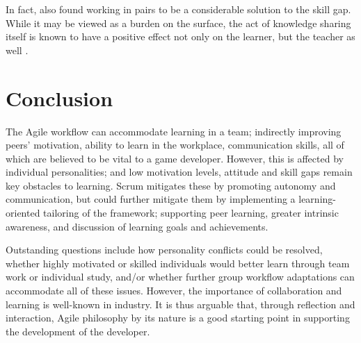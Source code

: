 \documentclass{scrartcl}
\begin{document}
In fact, \cite{group2005} also found working in pairs to be a considerable solution to the skill gap. While it may be viewed as a burden on the surface, the act of knowledge sharing itself is known to have a positive effect not only on the learner, but the teacher as well \cite{activepassive, motivation}.

\section{Conclusion}
The Agile workflow can accommodate learning in a team; indirectly improving peers' motivation, ability to learn in the workplace, communication skills, all of which are believed to be vital to a game developer. However, this is affected by individual personalities; and low motivation levels, attitude and skill gaps remain key obstacles to learning. Scrum mitigates these by promoting autonomy and communication, but could further mitigate them by implementing a learning-oriented tailoring of the framework; supporting peer learning, greater intrinsic awareness, and discussion of learning goals and achievements.

Outstanding questions include how personality conflicts could be resolved, whether highly motivated or skilled individuals would better learn through team work or individual study, and/or whether further group workflow adaptations can accommodate all of these issues. However, the importance of collaboration and learning is well-known in industry. It is thus arguable that, through reflection and interaction, Agile philosophy by its nature is a good starting point in supporting the development of the developer.


 

\end{document}
